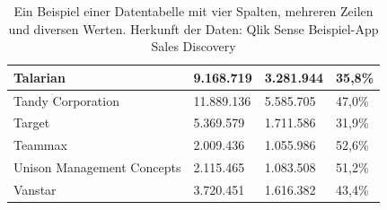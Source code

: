 \begin{table}[htb]
\begin{tabular}{|l|l|l|l|}
Talarian                           & 9.168.719      & 3.281.944             & 35,8\%                     \\ \hline
Tandy Corporation                  & 11.889.136     & 5.585.705             & 47,0\%                     \\ \hline
Target                             & 5.369.579      & 1.711.586             & 31,9\%                     \\ \hline
Teammax                            & 2.009.436      & 1.055.986             & 52,6\%                     \\ \hline
Unison Management Concepts         & 2.115.465      & 1.083.508             & 51,2\%                     \\ \hline
Vanstar                            & 3.720.451      & 1.616.382             & 43,4\%                     \\ \hline
\end{tabular}%
\caption[Beispiel einer Datentabelle]{Ein Beispiel einer Datentabelle mit vier Spalten, mehreren Zeilen und diversen Werten. Herkunft der Daten: Qlik Sense Beispiel-App \glqq Sales Discovery\grqq}
\label{tbl:data}
\end{table}


